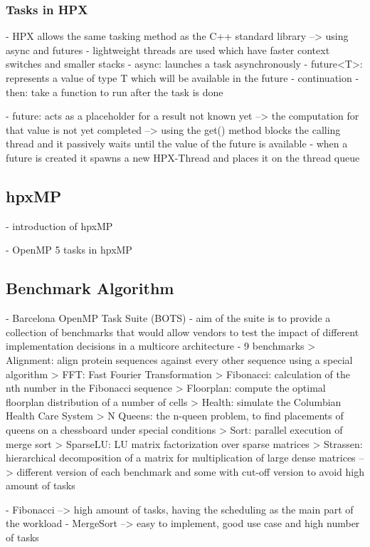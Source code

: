 \subsubsection{Tasks in HPX}
\cite{TheSTEARGroup.2020}
  - HPX allows the same tasking method as the C++ standard library --> using async and futures
    - lightweight threads are used which have faster context switches and smaller stacks
    - async: launches a task asynchronously
    - future<T>: represents a value of type T which will be available in the future
    - continuation - then: take a function to run after the task is done

  - future: acts as a placeholder for a result not known yet
    --> the computation for that value is not yet completed
    --> using the get() method blocks the calling thread and it passively waits until the value of the future is available
    - when a future is created it spawns a new HPX-Thread and places it on the thread queue


\subsection{hpxMP}
\cite{TianyiZhang.2019}
- introduction of hpxMP

\cite{Zhang.2192020}
- OpenMP 5 tasks in hpxMP


    
\subsection{Benchmark Algorithm}
- Barcelona OpenMP Task Suite (BOTS)
	- aim of the suite is to provide a collection of benchmarks that would allow vendors to test the impact of different implementation decisions in a multicore architecture
	- 9 benchmarks
		> Alignment: align protein sequences against every other sequence using a special algorithm
		> FFT: Fast Fourier Transformation
		> Fibonacci: calculation of the nth number in the Fibonacci sequence
		> Floorplan: compute the optimal floorplan distribution of a number of cells
		> Health: simulate the Columbian Health Care System
		> N Queens: the n-queen problem, to find placements of queens on a chessboard under special conditions
		> Sort: parallel execution of merge sort
		> SparseLU: LU matrix factorization over sparse matrices
		> Strassen: hierarchical decomposition of a matrix for multiplication of large dense matrices
	--> different version of each benchmark and some with cut-off version to avoid high amount of tasks
	

	- Fibonacci --> high amount of tasks, having the scheduling as the main part of the workload
	- MergeSort --> easy to implement, good use case and high number of tasks
	
